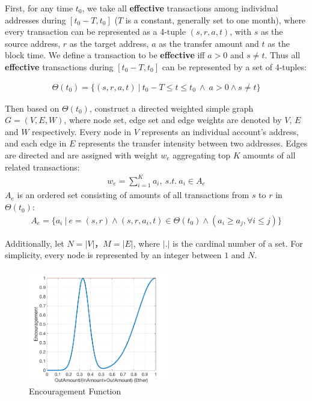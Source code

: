 First, for any time $t_0$, we take all \textbf{effective} transactions among individual addresses during $[t_0- T, t_0]$ ($T$ is a constant, generally set to one month), where every transaction can be represented as a 4-tuple $(s,r,a,t)$, with $s$ as the source address, $r$ as the target address, $a$ as the transfer amount and $t$ as the block time. We define a transaction to be \textbf{effective} iff $a>0$ and $s \neq t$. Thus all \textbf{effective} transactions during $[t_0- T, t_0]$ can be represented by a set of 4-tuples:

\begin{align}
\Theta(t_0) = \{(s, r, a, t)\ |\ t_0 - T \le t \le t_0\ \land \ a > 0 \land s \neq t \}	
\end{align}

Then based on $\Theta(t_0)$, construct a directed weighted simple graph $G=(V,E, W)$, where node set, edge set and edge weights are denoted by $V$, $E$ and $W$ respectively. Every node in $V$ represents an individual account's address, and each edge in $E$ represents the transfer intensity between two addresses. Edges are directed and are assigned with weight $w_e$ aggregating top $K$ amounts of all related transactions:
\begin{align}\label{formula:edgeweight}
w_e = \sum_{i=1}^K a_i,\ s.t.\ a_i \in A_e
\end{align}
$A_e$ is an ordered set consisting of amounts of all transactions from $s$ to $r$ in $\Theta(t_0)$:
\begin{align}
A_e = \{a_i\ |\ e = (s,r) \land (s, r, a_i, t) \in \Theta(t_0) \land (a_i \ge a_j, \forall i \le j) \}
\end{align}

Additionally, let $N = |V|$，$M = |E|$, where $|.|$ is the cardinal number of a set. For simplicity, every node is represented by an integer between $1$ and $N$.

\begin{figure}[h]
\centering
	\includegraphics[width=0.55\textwidth]{figs/encouragement_en.png}
	\caption{Encouragement Function}\label{fig:encouragement}
\end{figure}

